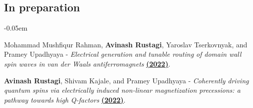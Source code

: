 \documentclass[12pt]{article}
\begin{document}
\vspace{-0.1in}
\subsection*{In preparation}
\begin{etaremune}
\itemsep-0.05em

\item Mohammad Mushfiqur Rahman, {\bf Avinash Rustagi}, Yaroslav Tserkovnyak, and Pramey Upadhyaya - \textit{Electrical generation and tunable routing of domain wall spin waves in van der Waals antiferromagnets} \href{}{\bf (2022)}.

 \item {\bf Avinash Rustagi}, Shivam Kajale, and Pramey Upadhyaya - \textit{Coherently driving quantum spins via electrically induced non-linear magnetization precessions: a pathway towards high Q-factors} \href{}{\bf (2022)}.
 
\end{etaremune}
\end{document}
